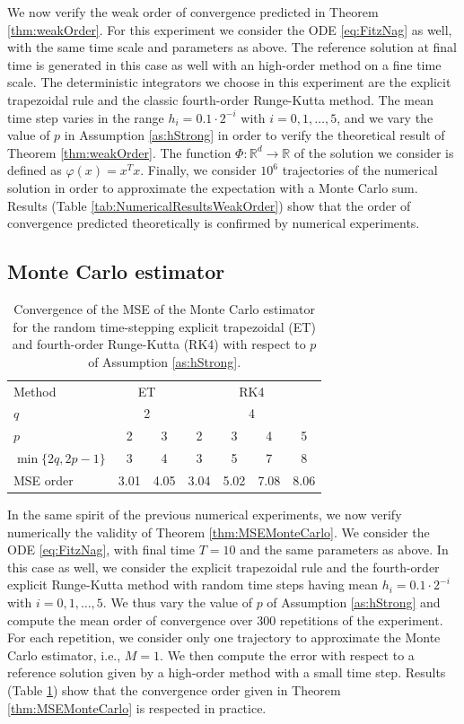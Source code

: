 \documentclass{siamart1116}
\numberwithin{theorem}{section}
\renewcommand{\phi}{\varphi}
\newcommand{\R}{\mathbb{R}}
\begin{document}
We now verify the weak order of convergence predicted in Theorem \ref{thm:weakOrder}. For this experiment we consider the ODE \eqref{eq:FitzNag} as well, with the same time scale and parameters as above. The reference solution at final time is generated in this case as well with an high-order method on a fine time scale. The deterministic integrators we choose in this experiment are the explicit trapezoidal rule and the classic fourth-order Runge-Kutta method. The mean time step varies in the range $h_i = 0.1\cdot 2^{-i}$ with $i = 0, 1, \ldots, 5$, and we vary the value of $p$ in Assumption \ref{as:hStrong} in order to verify the theoretical result of Theorem \ref{thm:weakOrder}. The function $\Phi\colon\R^d\to\R$ of the solution we consider is defined as $\phi(x) = x^Tx$. Finally, we consider $10^6$ trajectories of the numerical solution in order to approximate the expectation with a Monte Carlo sum. Results (Table \ref{tab:NumericalResultsWeakOrder}) show that the order of convergence predicted theoretically is confirmed by numerical experiments. 

\subsection{Monte Carlo estimator}

\begin{table}[t!]
	\centering
	\begin{tabular}{lcccccc}
		\toprule
		Method & \multicolumn{2}{c}{ET} & \multicolumn{4}{c}{RK4} \\ 
		\cmidrule(l{2pt}r{2pt}){2-3} \cmidrule(l{2pt}r{2pt}){4-7} 
		$q$ & \multicolumn{2}{c}{2} & \multicolumn{4}{c}{4} \\
		$p$ & 2 & 3 & 2 & 3 & 4 & 5\\
		$\min\{2q, 2p - 1\}$ & 3 & 4 & 3 & 5 & 7 & 8\\
		MSE order & 3.01 & 4.05 & 3.04 & 5.02 & 7.08 & 8.06\\
		\bottomrule
	\end{tabular}
	\caption{Convergence of the MSE of the Monte Carlo estimator for the random time-stepping explicit trapezoidal (ET) and fourth-order Runge-Kutta (RK4) with respect to $p$ of Assumption \ref{as:hStrong}.}
	\label{tab:NumericalResultsMSE}
\end{table}

In the same spirit of the previous numerical experiments, we now verify numerically the validity of Theorem \ref{thm:MSEMonteCarlo}. We consider the ODE \eqref{eq:FitzNag}, with final time $T = 10$ and the same parameters as above. In this case as well, we consider the explicit trapezoidal rule and the fourth-order explicit Runge-Kutta method with random time steps having mean $h_i = 0.1\cdot 2^{-i}$ with $i = 0, 1, \ldots, 5$. We thus vary the value of $p$ of Assumption \ref{as:hStrong} and compute the mean order of convergence over 300 repetitions of the experiment. For each repetition, we consider only one trajectory to approximate the Monte Carlo estimator, i.e., $M = 1$. We then compute the error with respect to a reference solution given by a high-order method with a small time step. Results (Table \ref{tab:NumericalResultsMSE}) show that the convergence order given in Theorem \ref{thm:MSEMonteCarlo} is respected in practice.
\end{document}
